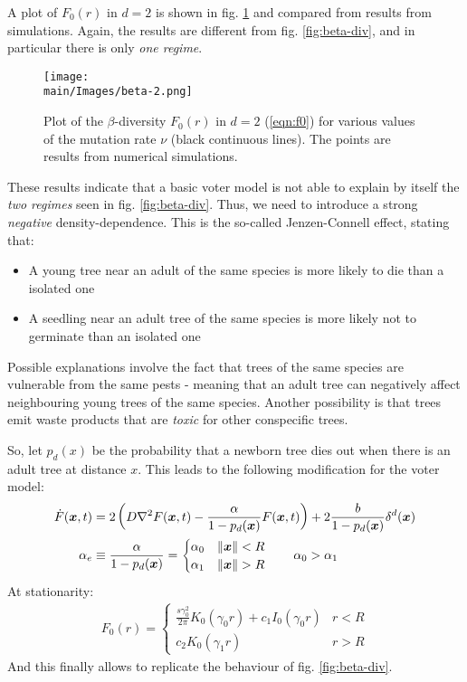 \documentclass[../../main.tex]{subfiles}
\begin{document}
A plot of $F_0(r)$ in $d=2$ is shown in fig. \ref{fig:beta-2} and compared from results from simulations. Again, the results are different from fig. \ref{fig:beta-div}, and in particular there is only \textit{one regime}. 

\begin{figure}[H]
    \centering
    \texttt{[image: \\main/Images/beta-2.png]}
    \caption{Plot of the $\beta$-diversity $F_0(r)$ in $d=2$ (\ref{eqn:f0}) for various values of the mutation rate $\nu$ (black continuous lines). The points are results from numerical simulations.}
    \label{fig:beta-2}
\end{figure}

These results indicate that a basic voter model is not able to explain by itself the \textit{two regimes} seen in fig. \ref{fig:beta-div}. Thus, we need to introduce  a strong \textit{negative} density-dependence. This is the so-called Jenzen-Connell effect, stating that:
\begin{itemize}
    \item A young tree near an adult of the same species is more likely to die than a isolated one
    \item A seedling near an adult tree of the same species is more likely not to germinate than an isolated one
\end{itemize}
Possible explanations involve the fact that trees of the same species are vulnerable from the same pests - meaning that an  adult tree can negatively affect neighbouring young trees of the same species. Another possibility is that trees emit waste products that are \textit{toxic} for other conspecific trees. 

\medskip

So, let $p_d(x)$ be the probability that a newborn tree dies out when there is an adult tree at distance $x$. This leads to the following modification for the voter model:
\begin{align*}
    \dot{F}(\bm{x},t) &= 2\left(D \nabla^2 F(\bm{x},t) - \frac{\alpha}{1-p_d(\bm{x})} F(\bm{x},t) \right) + 2 \frac{b}{1-p_d(\bm{x})} \delta^d(\bm{x})\\
    \alpha_e &\equiv \frac{\alpha}{1-p_d(\bm{x})}  = \begin{cases}
        \alpha_0 & \norm{\bm{x}} < R\\
        \alpha_1 & \norm{\bm{x}} > R
    \end{cases} \qquad \alpha_0 > \alpha_1
\end{align*}
At stationarity:
\begin{align*}
    F_0(r) = \begin{cases}
        \frac{s \gamma_0^2}{2 \pi} K_0(\gamma_0 r) + c_1 I_0(\gamma_0 r) & r < R\\
        c_2 K_0(\gamma_1 r) & r > R 
    \end{cases}
\end{align*}
And this finally allows to replicate the behaviour of fig. \ref{fig:beta-div}.
 
\end{document}
